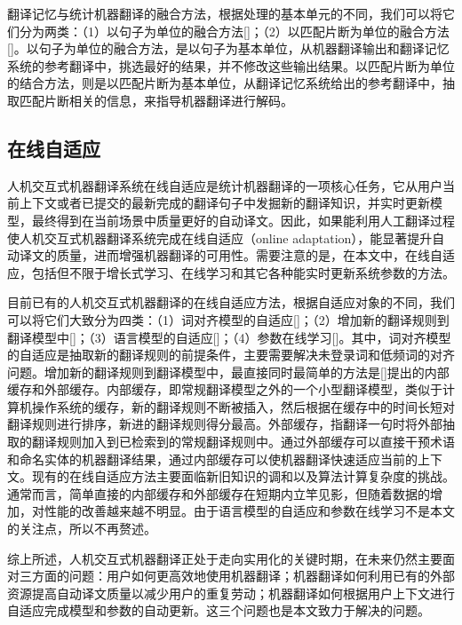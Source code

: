 翻译记忆与统计机器翻译的融合方法，根据处理的基本单元的不同，我们可以将它们分为两类：（1）以句子为单位的融合方法[\cite{He:2010a,He:2010b}]；（2）以匹配片断为单位的融合方法[\cite{Bicici:2008,Simard:2009,Smith:2009,Koehn:2010,Zhechev:2010,He:2011,Wang:2013b,wangkun:2013}]。以句子为单位的融合方法，是以句子为基本单位，从机器翻译输出和翻译记忆系统的参考翻译中，挑选最好的结果，并不修改这些输出结果。以匹配片断为单位的结合方法，则是以匹配片断为基本单位，从翻译记忆系统给出的参考翻译中，抽取匹配片断相关的信息，来指导机器翻译进行解码。

\subsection{在线自适应}

人机交互式机器翻译系统在线自适应是统计机器翻译的一项核心任务，它从用户当前上下文或者已提交的最新完成的翻译句子中发掘新的翻译知识，并实时更新模型，最终得到在当前场景中质量更好的自动译文。因此，如果能利用人工翻译过程使人机交互式机器翻译系统完成在线自适应（online adaptation），能显著提升自动译文的质量，进而增强机器翻译的可用性。需要注意的是，在本文中，在线自适应，包括但不限于增长式学习、在线学习和其它各种能实时更新系统参数的方法。

目前已有的人机交互式机器翻译的在线自适应方法，根据自适应对象的不同，我们可以将它们大致分为四类：（1）词对齐模型的自适应[\cite{ZhaoBing:2002,Hardt:2002,Mccarley:2011,Blain:2012,Farajian:2014}]；（2）增加新的翻译规则到翻译模型中[\cite{Nepveu:2004,Hardt:2002,Ortiz-Martinez:2010,Simard:2013,Denkowski:2014,Bertoldi:2014}]；（3）语言模型的自适应[\cite{Bertoldi:2014,Denkowski:2014}]；（4）参数在线学习[\cite{Bertoldi:2014,Denkowski:2014}]。其中，词对齐模型的自适应是抽取新的翻译规则的前提条件，主要需要解决未登录词和低频词的对齐问题。增加新的翻译规则到翻译模型中，最直接同时最简单的方法是[\cite{Bertoldi:2014}]提出的内部缓存和外部缓存。内部缓存，即常规翻译模型之外的一个小型翻译模型，类似于计算机操作系统的缓存，新的翻译规则不断被插入，然后根据在缓存中的时间长短对翻译规则进行排序，新进的翻译规则得分最高。外部缓存，指翻译一句时将外部抽取的翻译规则加入到已检索到的常规翻译规则中。通过外部缓存可以直接干预术语和命名实体的机器翻译结果，通过内部缓存可以使机器翻译快速适应当前的上下文。现有的在线自适应方法主要面临新旧知识的调和以及算法计算复杂度的挑战。通常而言，简单直接的内部缓存和外部缓存在短期内立竿见影，但随着数据的增加，对性能的改善越来越不明显。由于语言模型的自适应和参数在线学习不是本文的关注点，所以不再赘述。

综上所述，人机交互式机器翻译正处于走向实用化的关键时期，在未来仍然主要面对三方面的问题：用户如何更高效地使用机器翻译；机器翻译如何利用已有的外部资源提高自动译文质量以减少用户的重复劳动；机器翻译如何根据用户上下文进行自适应完成模型和参数的自动更新。这三个问题也是本文致力于解决的问题。

